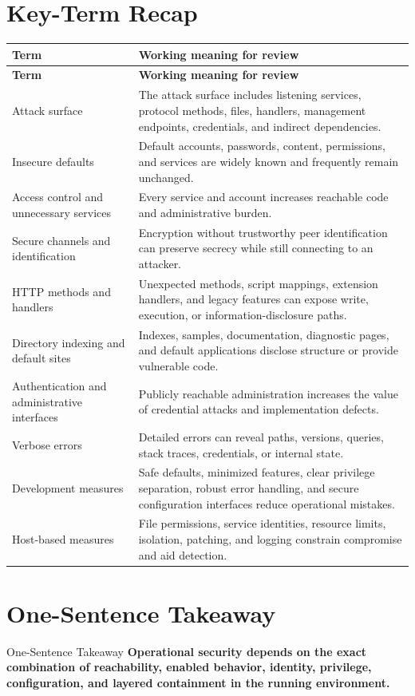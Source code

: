 \documentclass[11pt,letterpaper]{article}
\begin{document}
\section{Key-Term Recap}
\begin{longtable}{>{\raggedright\arraybackslash}p{}p{}}
\toprule
\textbf{Term} & \textbf{Working meaning for review} \\
\midrule
\endfirsthead
\toprule
\textbf{Term} & \textbf{Working meaning for review} \\
\midrule
\endhead
Attack surface & The attack surface includes listening services, protocol methods, files, handlers, management endpoints, credentials, and indirect dependencies. \\
Insecure defaults & Default accounts, passwords, content, permissions, and services are widely known and frequently remain unchanged. \\
Access control and unnecessary services & Every service and account increases reachable code and administrative burden. \\
Secure channels and identification & Encryption without trustworthy peer identification can preserve secrecy while still connecting to an attacker. \\
HTTP methods and handlers & Unexpected methods, script mappings, extension handlers, and legacy features can expose write, execution, or information-disclosure paths. \\
Directory indexing and default sites & Indexes, samples, documentation, diagnostic pages, and default applications disclose structure or provide vulnerable code. \\
Authentication and administrative interfaces & Publicly reachable administration increases the value of credential attacks and implementation defects. \\
Verbose errors & Detailed errors can reveal paths, versions, queries, stack traces, credentials, or internal state. \\
Development measures & Safe defaults, minimized features, clear privilege separation, robust error handling, and secure configuration interfaces reduce operational mistakes. \\
Host-based measures & File permissions, service identities, resource limits, isolation, patching, and logging constrain compromise and aid detection. \\
\bottomrule
\end{longtable}
\section{One-Sentence Takeaway}
\begin{CornellExamBox}{One-Sentence Takeaway}
\textbf{Operational security depends on the exact combination of reachability, enabled behavior, identity, privilege, configuration, and layered containment in the running environment.}
\end{CornellExamBox}
\end{document}
